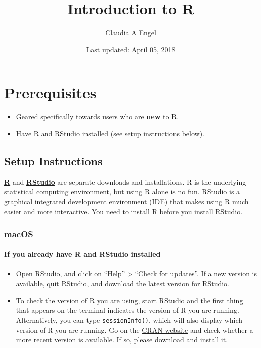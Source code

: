 \documentclass[]{book}
\title{Introduction to R}
\author{Claudia A Engel}
\date{Last updated: April 05, 2018}
\providecommand{\tightlist}{%
  \setlength{\itemsep}{0pt}\setlength{\parskip}{0pt}}
\theoremstyle{definition}
\theoremstyle{definition}
\theoremstyle{definition}
\theoremstyle{remark}
\begin{document}
\maketitle

{
\setcounter{tocdepth}{1}
\tableofcontents
}
\chapter*{Prerequisites}\label{prerequisites}

\begin{itemize}
\tightlist
\item
  Geared specifically towards users who are \textbf{new} to R.\\
\item
  Have \href{https://cran.r-project.org/}{R} and
  \href{https://www.rstudio.com/}{RStudio} installed (see setup
  instructions below).
\end{itemize}

\section*{Setup Instructions}\label{setup-instructions}

\href{https://cran.r-project.org/}{\textbf{R}} and
\href{https://www.rstudio.com/}{\textbf{RStudio}} are separate downloads
and installations. R is the underlying statistical computing
environment, but using R alone is no fun. RStudio is a graphical
integrated development environment (IDE) that makes using R much easier
and more interactive. You need to install R before you install RStudio.

\subsection*{macOS}\label{macos}

\subsubsection*{If you already have R and RStudio
installed}\label{if-you-already-have-r-and-rstudio-installed}

\begin{itemize}
\tightlist
\item
  Open RStudio, and click on ``Help'' \textgreater{} ``Check for
  updates''. If a new version is available, quit RStudio, and download
  the latest version for RStudio.
\item
  To check the version of R you are using, start RStudio and the first
  thing that appears on the terminal indicates the version of R you are
  running. Alternatively, you can type \texttt{sessionInfo()}, which
  will also display which version of R you are running. Go on the
  \href{https://cran.r-project.org/bin/macosx/}{CRAN website} and check
  whether a more recent version is available. If so, please download and
  install it.
\end{itemize}
\end{document}
